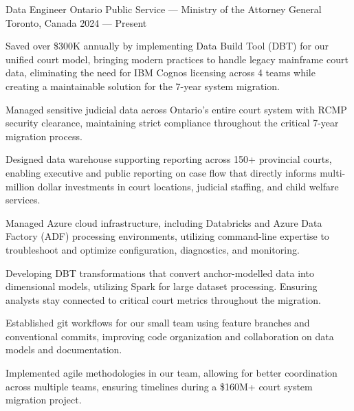 
\begin{cventries}

\cventry%
 {Data Engineer}
 {Ontario Public Service --- Ministry of the Attorney General}
 {Toronto, Canada}
 {2024 --- Present}
 {
	\begin{cvitems}
		\item Saved over \$300K annually by implementing Data Build Tool (DBT) for our unified court model, bringing modern practices to handle legacy mainframe court data, eliminating the need for IBM Cognos licensing across 4 teams while creating a maintainable solution for the 7-year system migration.
		\item Managed sensitive judicial data across Ontario's entire court system with RCMP security clearance, maintaining strict compliance throughout the critical 7-year migration process.
		\item Designed data warehouse supporting reporting across 150+ provincial courts, enabling executive and public reporting on case flow that directly informs multi-million dollar investments in court locations, judicial staffing, and child welfare services.
		\item Managed Azure cloud infrastructure, including Databricks and Azure Data Factory (ADF) processing environments, utilizing command-line expertise to troubleshoot and optimize configuration, diagnostics, and monitoring.
		\item Developing DBT transformations that convert anchor-modelled data into dimensional models, utilizing Spark for large dataset processing. Ensuring analysts stay connected to critical court metrics throughout the migration.
		\item Established git workflows for our small team using feature branches and conventional commits, improving code organization and collaboration on data models and documentation.
		\item Implemented agile methodologies in our team, allowing for better coordination across multiple teams, ensuring timelines during a \$160M+ court system migration project.
	\end{cvitems}
 }


\end{cventries}

